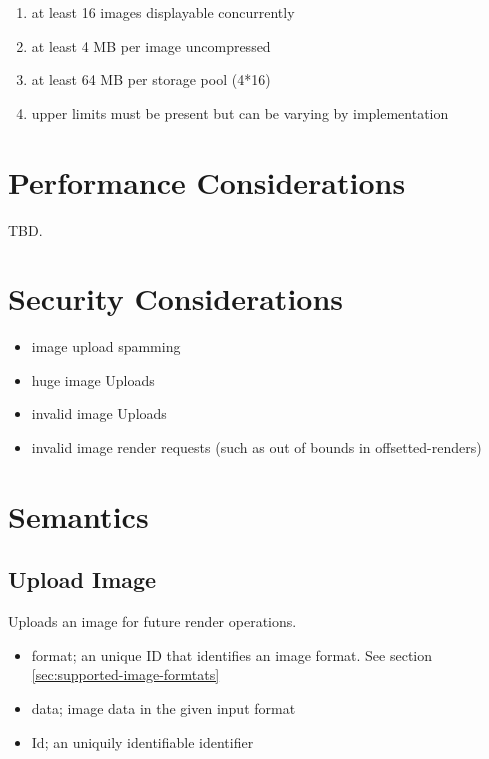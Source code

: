 \documentclass{article}
\newcommand{\code}[1]{\colorbox{light-gray}{\texttt{#1}}}
\begin{document}
\begin{enumerate}
    \item at least 16 images displayable concurrently
    \item at least 4 MB per image uncompressed
    \item at least 64 MB per storage pool (4*16)
    \item upper limits must be present but can be varying by implementation
\end{enumerate}
\section{Performance Considerations} %

TBD.

\section{Security Considerations} %

\begin{itemize}
    \item image upload spamming
    \item huge image Uploads
    \item invalid image Uploads
    \item invalid image render requests (such as out of bounds in offsetted-renders)
\end{itemize}

\section{Semantics} %

\subsection{Upload Image}

Uploads an image for future render operations.

\begin{itemize}
    \item format; an unique ID that identifies an image format. See section \ref{sec:supported-image-formtats}
    \item data; image data in the given input format
    \item Id; an uniquily identifiable identifier
\end{itemize}
\end{document}
